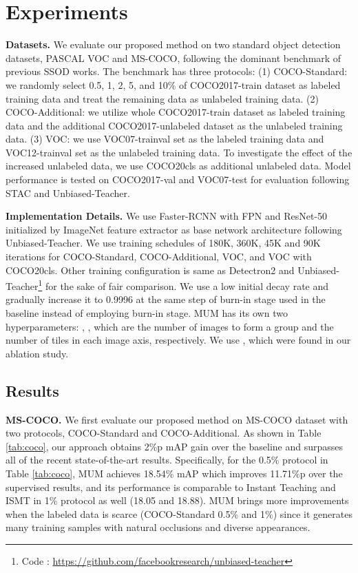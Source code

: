 \documentclass[10pt,twocolumn,letterpaper]{article}
\begin{document}
\section{Experiments}
\label{sec:experiments}
\noindent\textbf{Datasets.} We evaluate our proposed method on two standard object detection datasets, PASCAL VOC\cite{everingham2010pascal} and MS-COCO\cite{lin2014microsoft}, following the dominant benchmark of previous SSOD works\cite{jeong2019consistency, sohn2020simple, liu2021unbiased, zhou2021instant}.
The benchmark has three protocols: (1) COCO-Standard: we randomly select 0.5, 1, 2, 5, and 10\% of COCO2017-train dataset as labeled training data and treat the remaining data as unlabeled training data. 
(2) COCO-Additional: we utilize whole COCO2017-train dataset as labeled training data and the additional COCO2017-unlabeled dataset as the unlabeled training data.
(3) VOC: we use VOC07-trainval set as the labeled training data and VOC12-trainval set as the unlabeled training data. To investigate the effect of the increased unlabeled data, we use COCO20cls\cite{jeong2019consistency} as additional unlabeled data.
Model performance is tested on COCO2017-val and VOC07-test for evaluation following STAC\cite{sohn2020simple} and Unbiased-Teacher\cite{liu2021unbiased}.

\noindent\textbf{Implementation Details.}
We use Faster-RCNN\cite{ren2015faster} with FPN\cite{lin2017focal} and ResNet-50\cite{he2016deep} initialized by ImageNet\cite{deng2009imagenet} feature extractor as base network architecture following Unbiased-Teacher\cite{liu2021unbiased}.
We use training schedules of 180K, 360K, 45K and 90K iterations for COCO-Standard, COCO-Additional, VOC, and VOC with COCO20cls. 
Other training configuration is same as Detectron2 \cite{wu2019detectron2} and Unbiased-Teacher\footnote{Code : \url{https://github.com/facebookresearch/unbiased-teacher}} for the sake of fair comparison.
We use a low initial decay rate  and gradually increase it to 0.9996 at the same step of burn-in stage used in the baseline\cite{liu2021unbiased} instead of employing burn-in stage. 
MUM has its own two hyperparameters: , , which are the number of images to form a group and the number of tiles in each image axis, respectively. We use , which were found in our ablation study.

\subsection{Results}
\noindent\textbf{MS-COCO.}
We first evaluate our proposed method on MS-COCO dataset with two protocols, COCO-Standard and COCO-Additional.
As shown in Table \ref{tab:coco}, our approach obtains 2\%p mAP gain over the baseline\cite{liu2021unbiased} and surpasses all of the recent state-of-the-art results.
Specifically, for the 0.5\% protocol in Table \ref{tab:coco}, MUM achieves 18.54\% mAP which improves 11.71\%p over the supervised results, and its performance is comparable to Instant Teaching and ISMT in 1\% protocol as well (18.05 and 18.88).
MUM brings more improvements when the labeled data is scarce (COCO-Standard 0.5\% and 1\%) since it generates many training samples with natural occlusions and diverse appearances.
\end{document}
